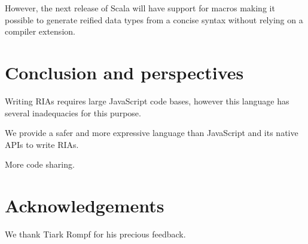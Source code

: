 \documentclass[american,english,runningheads]{llncs}
\begin{document}
However, the next release of Scala will have support for macros making it possible to generate reified data types from a concise syntax without relying on a compiler extension.

\section{Conclusion and perspectives}
\label{discussion}

Writing RIAs requires large JavaScript code bases, however this language has several inadequacies for this purpose.

We provide a safer and more expressive language than JavaScript and its native APIs to write RIAs.

More code sharing.

\section{Acknowledgements}

We thank Tiark Rompf for his precious feedback.



\end{document}
